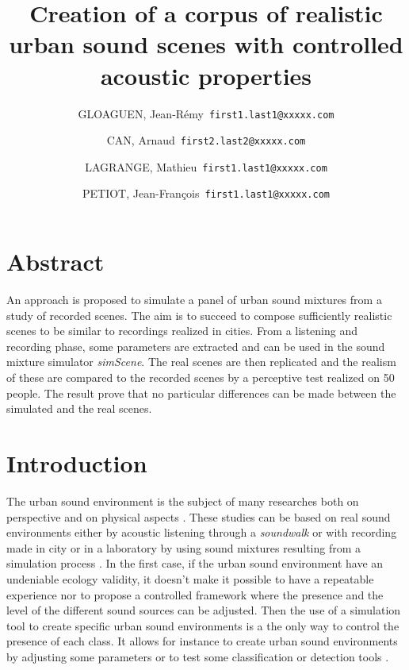 \documentclass[a4,11pt,twocolumn]{article}
\title{Creation of a corpus of realistic urban sound scenes with controlled acoustic properties}     %
\author{
  GLOAGUEN, Jean-R\'emy\      \texttt{first1.last1@xxxxx.com}
  \and
  CAN, Arnaud\      \texttt{first2.last2@xxxxx.com}
  \and
  LAGRANGE, Mathieu\      \texttt{first1.last1@xxxxx.com}
  \and
  PETIOT, Jean-Fran\c cois\      \texttt{first1.last1@xxxxx.com}
}
\begin{document}
\maketitle

\section*{Abstract}
An approach is proposed to simulate a panel of urban sound mixtures from a study of recorded scenes. The aim is to succeed to compose sufficiently realistic scenes to be similar to recordings realized in cities. From a listening and recording phase, some parameters are extracted and can be used in the sound mixture simulator \textit{simScene}. The real scenes are then replicated and the realism of these are compared to the recorded scenes by a perceptive test realized on 50 people. The result prove that no particular differences can be made between the simulated and the real scenes. 

\section*{Introduction}

The urban sound environment is the subject of many researches both on perspective \cite{jin_yong_soundwalk_2013} \cite{botteldooren_understanding_2011} and on physical aspects \cite{can_describing_2015} \cite{raimbault_ambient_2003}. These studies can be based on real sound environments either by acoustic listening through a \textit{soundwalk} \cite{adams_soundwalking_2008} or with recording made in city \cite{botteldooren_temporal_2006} or in a laboratory by using sound mixtures resulting from a simulation process \cite{lafay_new_2014}. In the first case, if the urban sound environment have an undeniable ecology validity, it doesn't make it possible to have a repeatable experience nor to propose a controlled framework where the presence and the level of the different sound sources can be adjusted. Then the use of a simulation tool to create specific urban sound environments is a the only way to control the presence of each class. It allows for instance to create urban sound environments by adjusting some parameters \cite{bruce_development_2009} or to test some classification or detection tools \cite{giannoulis_detection_2013} .
\end{document}
